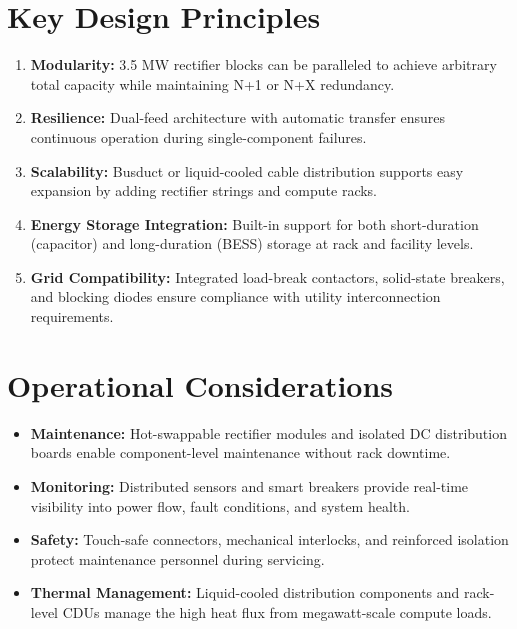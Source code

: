 \section*{Key Design Principles}

\begin{enumerate}
\item \textbf{Modularity:} 3.5 MW rectifier blocks can be paralleled to achieve arbitrary total capacity while maintaining N+1 or N+X redundancy.

\item \textbf{Resilience:} Dual-feed architecture with automatic transfer ensures continuous operation during single-component failures.

\item \textbf{Scalability:} Busduct or liquid-cooled cable distribution supports easy expansion by adding rectifier strings and compute racks.

\item \textbf{Energy Storage Integration:} Built-in support for both short-duration (capacitor) and long-duration (BESS) storage at rack and facility levels.

\item \textbf{Grid Compatibility:} Integrated load-break contactors, solid-state breakers, and blocking diodes ensure compliance with utility interconnection requirements.
\end{enumerate}

\section*{Operational Considerations}

\begin{itemize}
\item \textbf{Maintenance:} Hot-swappable rectifier modules and isolated DC distribution boards enable component-level maintenance without rack downtime.

\item \textbf{Monitoring:} Distributed sensors and smart breakers provide real-time visibility into power flow, fault conditions, and system health.

\item \textbf{Safety:} Touch-safe connectors, mechanical interlocks, and reinforced isolation protect maintenance personnel during servicing.

\item \textbf{Thermal Management:} Liquid-cooled distribution components and rack-level CDUs manage the high heat flux from megawatt-scale compute loads.
\end{itemize}
